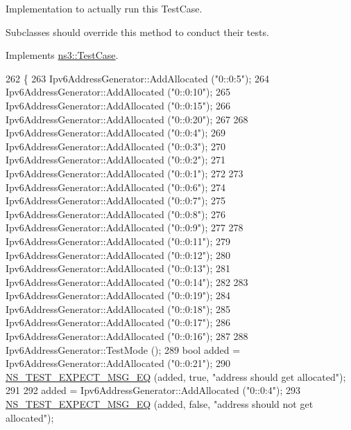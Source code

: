 Implementation to actually run this Test\+Case. 

Subclasses should override this method to conduct their tests. 

Implements \hyperlink{classns3_1_1TestCase_a8ff74680cf017ed42011e4be51917a24}{ns3\+::\+Test\+Case}.


\begin{DoxyCode}
262 \{
263   Ipv6AddressGenerator::AddAllocated (\textcolor{stringliteral}{"0::0:5"});
264   Ipv6AddressGenerator::AddAllocated (\textcolor{stringliteral}{"0::0:10"});
265   Ipv6AddressGenerator::AddAllocated (\textcolor{stringliteral}{"0::0:15"});
266   Ipv6AddressGenerator::AddAllocated (\textcolor{stringliteral}{"0::0:20"});
267 
268   Ipv6AddressGenerator::AddAllocated (\textcolor{stringliteral}{"0::0:4"});
269   Ipv6AddressGenerator::AddAllocated (\textcolor{stringliteral}{"0::0:3"});
270   Ipv6AddressGenerator::AddAllocated (\textcolor{stringliteral}{"0::0:2"});
271   Ipv6AddressGenerator::AddAllocated (\textcolor{stringliteral}{"0::0:1"});
272 
273   Ipv6AddressGenerator::AddAllocated (\textcolor{stringliteral}{"0::0:6"});
274   Ipv6AddressGenerator::AddAllocated (\textcolor{stringliteral}{"0::0:7"});
275   Ipv6AddressGenerator::AddAllocated (\textcolor{stringliteral}{"0::0:8"});
276   Ipv6AddressGenerator::AddAllocated (\textcolor{stringliteral}{"0::0:9"});
277 
278   Ipv6AddressGenerator::AddAllocated (\textcolor{stringliteral}{"0::0:11"});
279   Ipv6AddressGenerator::AddAllocated (\textcolor{stringliteral}{"0::0:12"});
280   Ipv6AddressGenerator::AddAllocated (\textcolor{stringliteral}{"0::0:13"});
281   Ipv6AddressGenerator::AddAllocated (\textcolor{stringliteral}{"0::0:14"});
282 
283   Ipv6AddressGenerator::AddAllocated (\textcolor{stringliteral}{"0::0:19"});
284   Ipv6AddressGenerator::AddAllocated (\textcolor{stringliteral}{"0::0:18"});
285   Ipv6AddressGenerator::AddAllocated (\textcolor{stringliteral}{"0::0:17"});
286   Ipv6AddressGenerator::AddAllocated (\textcolor{stringliteral}{"0::0:16"});
287 
288   Ipv6AddressGenerator::TestMode ();
289   \textcolor{keywordtype}{bool} added = Ipv6AddressGenerator::AddAllocated (\textcolor{stringliteral}{"0::0:21"});
290   \hyperlink{group__testing_ga7304ba46a28d8cf08dfdfd6499cf7068}{NS\_TEST\_EXPECT\_MSG\_EQ} (added, \textcolor{keyword}{true}, \textcolor{stringliteral}{"address should get allocated"});
291 
292   added = Ipv6AddressGenerator::AddAllocated (\textcolor{stringliteral}{"0::0:4"});
293   \hyperlink{group__testing_ga7304ba46a28d8cf08dfdfd6499cf7068}{NS\_TEST\_EXPECT\_MSG\_EQ} (added, \textcolor{keyword}{false}, \textcolor{stringliteral}{"address should not get allocated"});

\end{DoxyCode}

